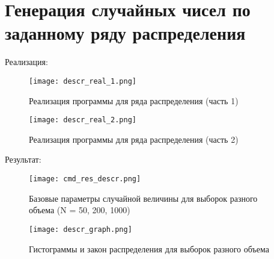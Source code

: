 \chapter{Генерация случайных чисел по заданному ряду распределения}
\label{ch:chap2}

Реализация:\\

\begin{figure}[H]
    \centering
    \texttt{[image: descr\_real\_1.png]}
    \caption{Реализация программы для ряда распределения (часть 1)}
\end{figure}


\begin{figure}[H]
    \centering
    \texttt{[image: descr\_real\_2.png]}
    \caption{Реализация программы для ряда распределения (часть 2)}
\end{figure}

Результат: \\

\begin{figure}[H]
    \centering
    \texttt{[image: cmd\_res\_descr.png]}
    \caption{Базовые параметры случайной величины для выборок разного объема (N = 50, 200, 1000)}
\end{figure}


\begin{figure}[H]
    \centering
    \texttt{[image: descr\_graph.png]}
    \caption{Гистограммы и закон распределения для выборок разного объема}
\end{figure}

\endinput